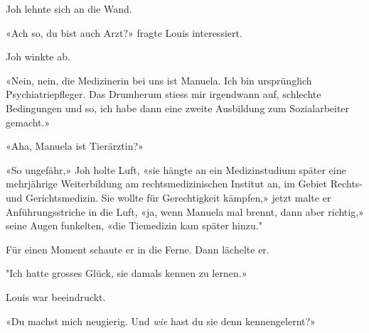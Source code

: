 Joh lehnte sich an die Wand.

«Ach so, du bist auch Arzt?» fragte Louis interessiert.

Joh winkte ab.

«Nein, nein, die Medizinerin bei uns ist Manuela. Ich bin ursprünglich Psychiatriepfleger. 
Das Drumherum stiess mir irgendwann
auf, schlechte Bedingungen und so, ich habe dann eine zweite Ausbildung 
zum Sozialarbeiter gemacht.»

«Aha, Manuela ist Tierärztin?»

«So ungefähr,» Joh holte Luft, «sie hängte an ein Medizinstudium später
eine mehrjährige Weiterbildung am rechtsmedizinischen Institut an,
im Gebiet Rechts- und Gerichtsmedizin. Sie wollte für Gerechtigkeit kämpfen,» jetzt malte er Anführungsstriche in die Luft, «ja, wenn Manuela mal brennt, dann aber richtig,» seine Augen funkelten, «die Tiemedizin kam später hinzu."

Für einen Moment schaute er in die Ferne. Dann lächelte er.

"Ich hatte grosses Glück, sie damals kennen zu lernen.»

Louis war beeindruckt.

«Du machst mich neugierig. Und \emph{wie} hast du sie denn
kennengelernt?»
